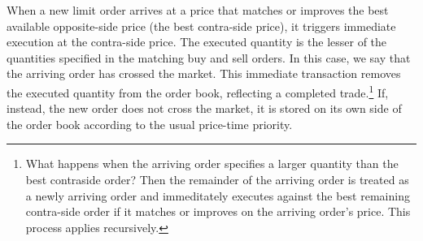 When a new limit order arrives at a price that matches or improves the best available opposite-side price (the best contra-side price), it triggers immediate execution at the contra-side price. 
The executed quantity is the lesser of the quantities specified in the matching buy and sell orders. 
In this case, we say that the arriving order has crossed the market. This immediate transaction removes the executed quantity from the order book, reflecting a completed trade.\footnote{
What happens when the arriving order specifies a larger quantity than the best contraside order? 
Then the remainder of the arriving order is treated as a newly arriving order and immeditately executes against the best remaining contra-side order if it matches or improves on the arriving order's price. This process applies recursively.} 
If, instead, the new order does not cross the market, it is stored on its own side of the order book according to the usual price-time priority.





